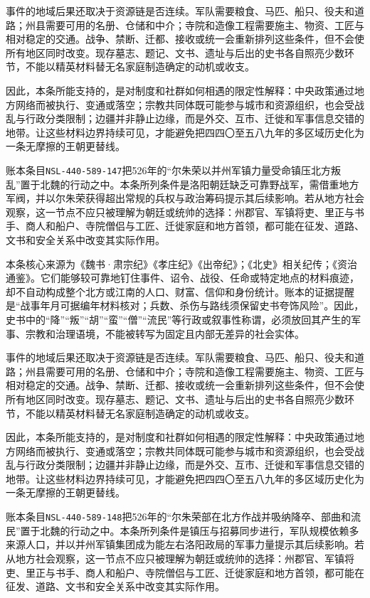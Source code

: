 事件的地域后果还取决于资源链是否连续。军队需要粮食、马匹、船只、役夫和道路；州县需要可用的名册、仓储和中介；寺院和造像工程需要施主、物资、工匠与相对稳定的交通。战争、禁断、迁都、接收或统一会重新排列这些条件，但不会使所有地区同时改变。现存墓志、题记、文书、遗址与后出的史书各自照亮少数环节，不能以精英材料替无名家庭制造确定的动机或收支。

因此，本条所能支持的，是对制度和社群如何相遇的限定性解释：中央政策通过地方网络而被执行、变通或落空；宗教共同体既可能参与城市和资源组织，也会受战乱与行政分类限制；边疆并非静止边缘，而是外交、互市、迁徙和军事信息交错的地带。让这些材料边界持续可见，才能避免把四四〇至五八九年的多区域历史化为一条无摩擦的王朝更替线。

账本条目\texttt{NSL-440-589-147}把526年的“尔朱荣以并州军镇力量受命镇压北方叛乱”置于北魏的行动之中。本条所列条件是洛阳朝廷缺乏可靠野战军，需借重地方军阀，并以尔朱荣获得超出常规的兵权与政治筹码提示其后续影响。若从地方社会观察，这一节点不应只被理解为朝廷或统帅的选择：州郡官、军镇将吏、里正与书手、商人和船户、寺院僧侣与工匠、迁徙家庭和地方首领，都可能在征发、道路、文书和安全关系中改变其实际作用。

本条核心来源为《魏书·肃宗纪》《孝庄纪》《出帝纪》；《北史》相关纪传；《资治通鉴》。它们能够较可靠地钉住事件、诏令、战役、任命或特定地点的材料痕迹，却不自动构成整个北方或江南的人口、财富、信仰和身份统计。账本的证据提醒是“战事年月可据编年材料核对；兵数、杀伤与路线须保留史书夸饰风险”。因此，史书中的“降”“叛”“胡”“蛮”“僧”“流民”等行政或叙事性称谓，必须放回其产生的军事、宗教和治理语境，不能被转写为固定且内部无差异的社会实体。

事件的地域后果还取决于资源链是否连续。军队需要粮食、马匹、船只、役夫和道路；州县需要可用的名册、仓储和中介；寺院和造像工程需要施主、物资、工匠与相对稳定的交通。战争、禁断、迁都、接收或统一会重新排列这些条件，但不会使所有地区同时改变。现存墓志、题记、文书、遗址与后出的史书各自照亮少数环节，不能以精英材料替无名家庭制造确定的动机或收支。

因此，本条所能支持的，是对制度和社群如何相遇的限定性解释：中央政策通过地方网络而被执行、变通或落空；宗教共同体既可能参与城市和资源组织，也会受战乱与行政分类限制；边疆并非静止边缘，而是外交、互市、迁徙和军事信息交错的地带。让这些材料边界持续可见，才能避免把四四〇至五八九年的多区域历史化为一条无摩擦的王朝更替线。

账本条目\texttt{NSL-440-589-148}把526年的“尔朱荣部在北方作战并吸纳降卒、部曲和流民”置于北魏的行动之中。本条所列条件是镇压与招募同步进行，军队规模依赖多来源人口，并以并州军镇集团成为能左右洛阳政局的军事力量提示其后续影响。若从地方社会观察，这一节点不应只被理解为朝廷或统帅的选择：州郡官、军镇将吏、里正与书手、商人和船户、寺院僧侣与工匠、迁徙家庭和地方首领，都可能在征发、道路、文书和安全关系中改变其实际作用。

